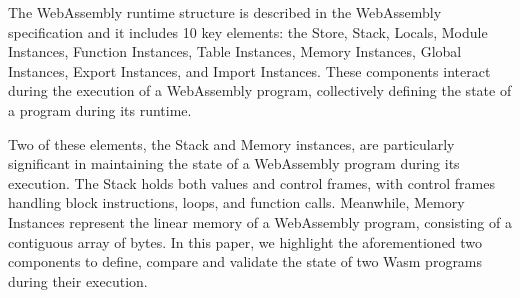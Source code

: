 The WebAssembly runtime structure is described in the WebAssembly specification and it includes 10 key elements: the Store, Stack, Locals, Module Instances, Function Instances, Table Instances, Memory Instances, Global Instances, Export Instances, and Import Instances. These components interact during the execution of a WebAssembly program, collectively defining the state of a program during its runtime.

Two of these elements, the Stack and Memory instances, are particularly significant in maintaining the state of a WebAssembly program during its execution. The Stack holds both values and control frames, with control frames handling block instructions, loops, and function calls. Meanwhile, Memory Instances represent the linear memory of a WebAssembly program, consisting of a contiguous array of bytes.
In this paper, we highlight the aforementioned two components to define, compare and validate the state of two Wasm programs during their execution. 

\begin{code}
    \begin{minipage}[t]{0.45\linewidth}
%
\end{minipage}\hspace{10mm}
\begin{minipage}[t]{0.46\linewidth}
%
%
\end{minipage}






\end{code}


